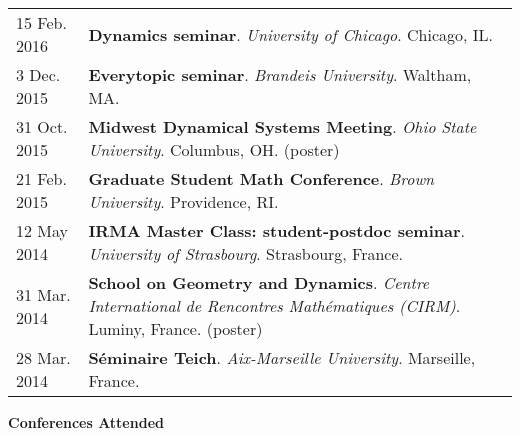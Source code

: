 \begin{center}
{\begin{longtable}{p{}  p{}}
15 Feb.  2016 & \textbf{Dynamics seminar}. \textit{University of Chicago}.  Chicago, IL.  \\ 
3 Dec.  2015 & \textbf{Everytopic seminar}. \textit{Brandeis University}.  Waltham, MA.  \\ 
31 Oct.  2015 & \textbf{Midwest Dynamical Systems Meeting}. \textit{Ohio State University}.  Columbus, OH. (poster) \\ 
21 Feb.  2015 & \textbf{Graduate Student Math Conference}. \textit{Brown University}.  Providence, RI.  \\ 
12 May  2014 & \textbf{IRMA Master Class: student-postdoc seminar}. \textit{University of Strasbourg}.  Strasbourg, France.  \\ 
31 Mar.  2014 & \textbf{School on Geometry and Dynamics}. \textit{Centre International de Rencontres Math\'ematiques (CIRM)}.  Luminy, France. (poster) \\ 
28 Mar.  2014 & \textbf{S\'eminaire Teich}. \textit{Aix-Marseille University}.  Marseille, France.  
    \end{longtable}
    } 
    \end{center}

    \vspace{-1em}
    

    \textbf{\large Conferences Attended}
    
